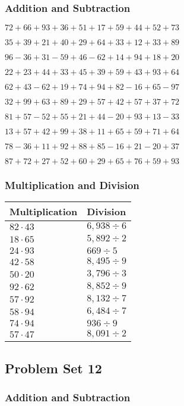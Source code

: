 \hypertarget{addition-and-subtraction-51}{%
\subsubsection{Addition and
Subtraction}\label{addition-and-subtraction-51}}

\(72+66+93+36+51+17+59+44+52+ 73\)

\(35+39+21+40+29+64+33+12+33+89\)

\(96-36+31-59+46-62+14+94+18+20\)

\(22+23+44+33+45+39+59+43+93+64\)

\(62+43-62+19+74+94+82-16+65-97\)

\(32+99+63+89+29+57+42+57+37+72\)

\(81+57-52+55+21+44-20+93+13-33\)

\(13+57+42+99+38+11+65+59+71+64\)

\(78-36+11+92+88+85-16+21-20+37\)

\(87+72+27+52+60+29+65+76+59+93\)

\hypertarget{multiplication-and-division-51}{%
\subsubsection{Multiplication and
Division}\label{multiplication-and-division-51}}

\begin{longtable}[]{@{}ll@{}}
\toprule
Multiplication & Division\tabularnewline
\midrule
\endhead
\(82\cdot43\) & \(6,938÷6\)\tabularnewline
\(18\cdot65\) & \(5,892÷2\)\tabularnewline
\(24\cdot93\) & \(669÷5\)\tabularnewline
\(42\cdot58\) & \(8,495÷9\)\tabularnewline
\(50\cdot20\) & \(3,796÷3\)\tabularnewline
\(92\cdot62\) & \(8,852÷9\)\tabularnewline
\(57\cdot92\) & \(8,132÷7\)\tabularnewline
\(58\cdot94\) & \(6,484÷7\)\tabularnewline
\(74\cdot94\) & \(936÷9\)\tabularnewline
\(57\cdot47\) & \(8,091÷2\)\tabularnewline
\bottomrule
\end{longtable}

\hypertarget{problem-set-12-1}{%
\subsection{Problem Set 12}\label{problem-set-12-1}}

\hypertarget{addition-and-subtraction-52}{%
\subsubsection{Addition and
Subtraction}\label{addition-and-subtraction-52}}

